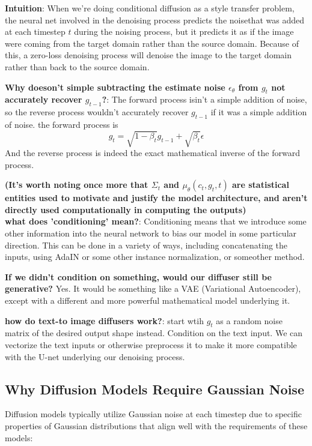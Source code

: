 \documentclass[12pt]{article}
\begin{document}
\textbf{Intuition}: When we're doing conditional diffusion as a style transfer problem, the neural net involved in the denoising process predicts the noisethat was added at each timestep \(t\) during the noising process, but it predicts it as if the image were coming from the target domain rather than the source domain. Because of this, a zero-loss denoising process will denoise the image to the target domain rather than back to the source domain.

\textbf{Why doeson't simple subtracting the estimate noise \(\epsilon_\theta\) from \(g_t\) not accurately recover \(g_{t-1}\)?}: The forward process isin't a simple addition of noise, so the reverse process wouldn't accurately recover \(g_{t-1}\) if it was a simple addition of noise. the forward process is 
\[g_t = \sqrt{1 - \beta_t}g_{t-1} + \sqrt{\beta_t}\epsilon\] And the reverse process is indeed the exact mathematical inverse of the forward process.

\textbf{(It's worth noting once more that \(\Sigma_t\) and \(\mu_\theta(c_t, g_t,t)\) are statistical entities used to motivate and justify the model architecture, and aren't directly used computationally in computing the outputs)}\\

\textbf{what does 'conditioning' mean?}: Conditioning means that we introduce some other information into the neural network to bias our model in some particular direction. This can be done in a variety of ways, including concatenating the inputs, using AdaIN or some other instance normalization, or someother method.

\textbf{If we didn't condition on something, would our diffuser still be generative?} Yes. It would be something like a VAE (Variational Autoencoder), except with a different and more powerful mathematical model underlying it. 

\textbf{how do text-to image diffusers work?}: start wtih \(g_t\) as a random noise matrix of the desired output shape instead. Condition on the text input. We can vectorize the text inputs or otherwise preprocess it to make it more compatible with the U-net underlying our denoising process.

\subsection*{Why Diffusion Models Require Gaussian Noise}

Diffusion models typically utilize Gaussian noise at each timestep due to specific properties of Gaussian distributions that align well with the requirements of these models:
\end{document}
